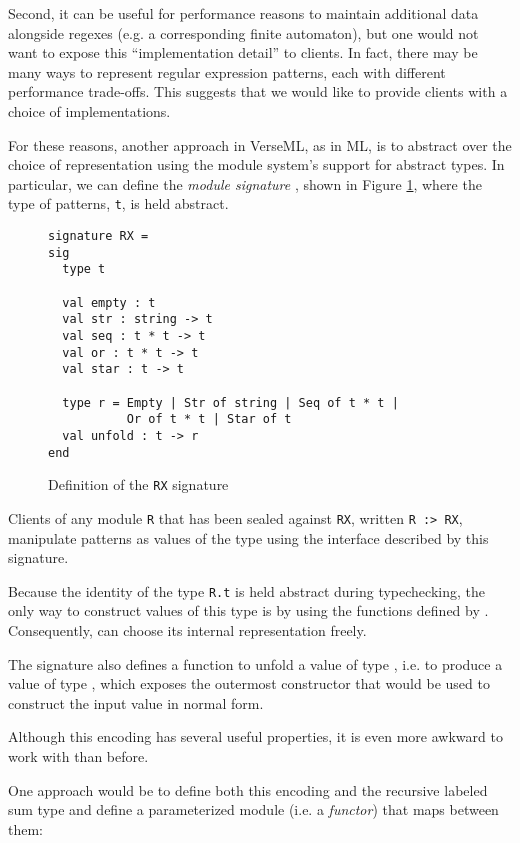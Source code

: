 {{Second, it can be useful for performance reasons to maintain additional data alongside regexes (e.g. a corresponding finite automaton), but one would not want to expose this ``implementation detail'' to clients. In fact, there may be many ways to represent regular expression patterns, each with different performance trade-offs. This suggests that we would like to provide clients with a choice of implementations. 

For these reasons, another approach in VerseML, as in ML, is to abstract over the choice of representation using  the module system's support for abstract types. In particular, we can define the \emph{module signature} , shown in Figure \ref{fig:signature-RX}, where the type of patterns, \lstinline{t}, is held abstract.

\begin{figure}[ht]
\begin{lstlisting}[deletekeywords={case},numbers=none]
signature RX = 
sig
  type t

  val empty : t
  val str : string -> t
  val seq : t * t -> t
  val or : t * t -> t
  val star : t -> t

  type r = Empty | Str of string | Seq of t * t | 
           Or of t * t | Star of t
  val unfold : t -> r
end
\end{lstlisting}
\caption{Definition of the \lstinline{RX} signature}
\label{fig:signature-RX}
\end{figure}

 Clients of any module \lstinline{R} that has been sealed against \lstinline{RX}, written \lstinline{R :> RX}, manipulate patterns as values of the type  using the interface described by this signature. 

 Because the identity of the type \lstinline{R.t} is held abstract  during typechecking, the only way to construct values of this type is by using the functions defined by . Consequently,  can  choose its internal representation freely. 

 The signature also defines a function  to unfold a value of type , i.e. to produce a value of type , which exposes the outermost constructor that would be used to construct the input value in normal form.

 Although this encoding has several useful properties, it is even more awkward to work with than before.

One approach would be to define both this encoding and the recursive labeled sum type  and define a parameterized module (i.e. a \emph{functor}) that maps between them: 

}}
